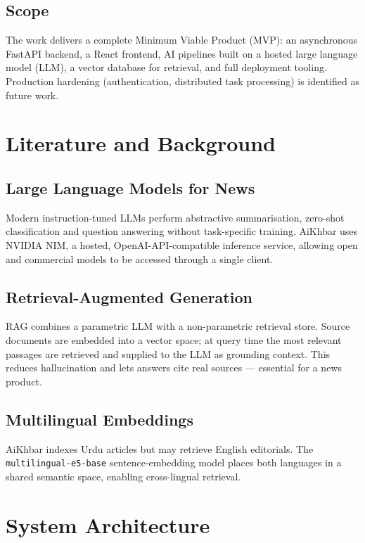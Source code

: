 \documentclass[11pt,a4paper]{article}
\begin{document}
\subsection{Scope}
The work delivers a complete Minimum Viable Product (MVP): an asynchronous
FastAPI backend, a React frontend, AI pipelines built on a hosted large
language model (LLM), a vector database for retrieval, and full deployment
tooling. Production hardening (authentication, distributed task processing) is
identified as future work.

\section{Literature and Background}

\subsection{Large Language Models for News}
Modern instruction-tuned LLMs perform abstractive summarisation, zero-shot
classification and question answering without task-specific training. AiKhbar
uses NVIDIA NIM, a hosted, OpenAI-API-compatible inference service, allowing
open and commercial models to be accessed through a single client.

\subsection{Retrieval-Augmented Generation}
RAG combines a parametric LLM with a non-parametric retrieval store. Source
documents are embedded into a vector space; at query time the most relevant
passages are retrieved and supplied to the LLM as grounding context. This
reduces hallucination and lets answers cite real sources --- essential for a
news product.

\subsection{Multilingual Embeddings}
AiKhbar indexes Urdu articles but may retrieve English editorials. The
\texttt{multilingual-e5-base} sentence-embedding model places both languages in
a shared semantic space, enabling cross-lingual retrieval.

\section{System Architecture}
\end{document}
